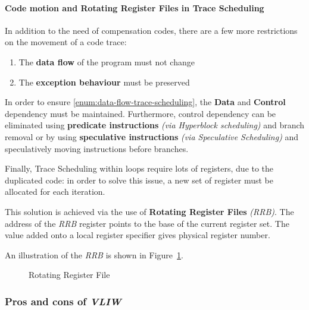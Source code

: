 \documentclass[english]{article}
\begin{document}
\paragraph{Code motion and Rotating Register Files in Trace Scheduling}

In addition to the need of compensation codes, there are a few more restrictions on the movement of a code trace:

\begin{enumerate}[label=\Alph*), ref=(\Alph*)]
  \item \label{enum:data-flow-trace-scheduling} The \textbf{data flow} of the program must not change
  \item \label{enum:exception-behaviour-trace-scheduling} The \textbf{exception behaviour} must be preserved
\end{enumerate}

\bigskip

In order to ensure \ref{enum:data-flow-trace-scheduling}, the \textbf{Data} and \textbf{Control} dependency must be maintained.
Furthermore, control dependency can be eliminated using \textbf{predicate instructions} \textit{(via Hyperblock scheduling) }and branch removal or by using \textbf{speculative instructions} \textit{(via Speculative Scheduling)} and speculatively moving instructions before branches.

Finally, Trace Scheduling within loops require lots of registers, due to the duplicated code:
in order to solve this issue, a new set of register must be allocated for each iteration.

This solution is achieved via the use of \textbf{Rotating Register Files} \textit{(RRB)}.
The address of the \textit{RRB} register points to the base of the current register set.
The value added onto a local register specifier gives physical register number.

\bigskip
An illustration of the \textit{RRB} is shown in Figure~\ref{fig:rotating-register-file}.

\begin{figure}[htbp]
  \bigskip
  \centering
  \caption{Rotating Register File}
  \label{fig:rotating-register-file}
  \bigskip
\end{figure}

\subsubsection{Pros and cons of \textit{VLIW}}
\end{document}
